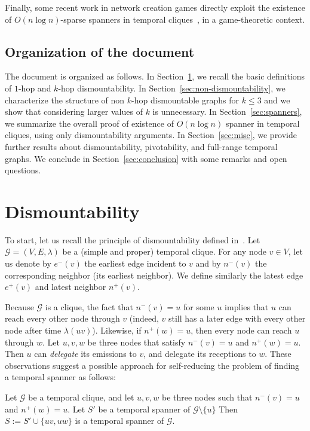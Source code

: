 \documentclass[USenglish, a4paper, thm-restate,numberwithinsect, cleveref]{lipics-v2021}
\newcommand{\G}{\ensuremath{\mathcal{G}}\xspace}
\begin{document}
  Finally, some recent work in network creation games directly exploit the existence of $O(n\log n)$-sparse spanners in temporal cliques~\cite{game-theory}, in a game-theoretic context.

  \subsection{Organization of the document}

  The document is organized as follows. In Section~\ref{sec:dismountability}, we recall the basic definitions of $1$-hop and $k$-hop dismountability. In Section~\ref{sec:non-dismountability}, we characterize the structure of non $k$-hop dismountable graphs for $k\le 3$ and we show that considering larger values of $k$ is unnecessary. In Section~\ref{sec:spanners}, we summarize the overall proof of existence of $O(n \log n)$ spanner in temporal cliques, using only dismountability arguments. In Section~\ref{sec:misc}, we provide further results about dismountability, pivotability, and full-range temporal graphs. We conclude in Section~\ref{sec:conclusion} with some remarks and open questions.

  \section{Dismountability}
  \label{sec:dismountability}

To start, let us recall the principle of dismountability defined in~\cite{CPS19}.
Let $\G=(V,E,\lambda)$ be a (simple and proper) temporal clique. For any node $v\in V$, let us denote by $e^-(v)$ the earliest edge incident to $v$ and by $n^-(v)$ the corresponding neighbor (its earliest neighbor).
We define similarly the latest edge $e^+(v)$ and latest neighbor $n^+(v)$.

Because $\G$ is a clique, the fact that $n^-(v)=u$ for some $u$ implies that $u$ can reach every other node through $v$ (indeed, $v$ still has a later edge with every other node after time $\lambda(uv)$). Likewise, if $n^+(w)=u$, then every node can reach $u$ through $w$.
Let $u,v,w$ be three nodes that satisfy $n^-(v)=u$ and $n^+(w)=u$. Then $u$ can {\em delegate} its emissions to $v$, and delegate its receptions to $w$.
These observations suggest a possible approach for self-reducing the problem of finding a temporal spanner as follows:

\begin{theorem}
  \label{thm:dismountability}
  Let $\G$ be a temporal clique, and let $u, v, w$ be three nodes such that $n^-(v)=u$ and $n^+(w)=u$. Let $S'$ be a temporal spanner of $\G\setminus \{u\}$ %
  Then $S:=S'\cup \{uv, uw\}$ is a temporal spanner of $\G$.
\end{theorem}
\end{document}
